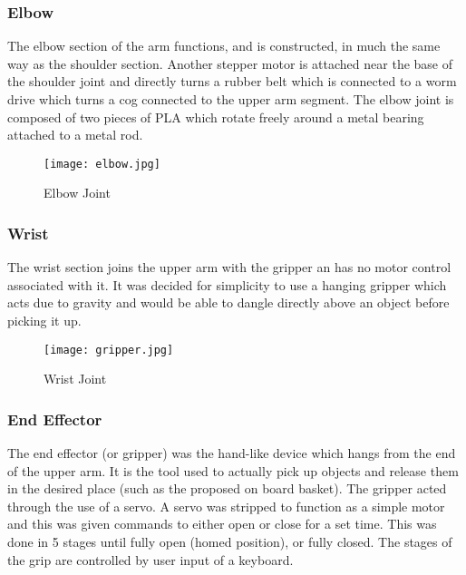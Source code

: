 \subsubsection{Elbow}
The elbow section of the arm functions, and is constructed, in much the same way as the shoulder section.  Another stepper motor is attached near the base of the shoulder joint and directly turns a rubber belt which is connected to a worm drive which turns a cog connected to the upper arm segment.  The elbow joint is composed of two pieces of PLA which rotate freely around a metal bearing attached to a metal rod.

\begin{figure}[!htb]
\begin{center}
\texttt{[image: elbow.jpg]}
\end{center}
\caption{Elbow Joint}
\label{fig:elbow}
\end{figure}

\subsubsection{Wrist}
The wrist section joins the upper arm with the gripper an has no motor control associated with it.  It was decided for simplicity to use a hanging gripper which acts due to gravity and would be able to dangle directly above an object before picking it up. 

\begin{figure}[!htb]
\begin{center}
\texttt{[image: gripper.jpg]}
\end{center}
\caption{Wrist Joint}
\label{fig:wrist}
\end{figure}

\subsubsection{End Effector}
The end effector (or gripper) was the hand-like device which hangs from the end of the upper arm.  It is the tool used to actually pick up objects and release them in the desired place (such as the proposed on board basket).  The gripper acted through the use of a servo.  A servo was stripped to function as a simple motor and this was given commands to either open or close for a set time.  This was done in 5 stages until fully open (homed position), or fully closed.  The stages of the grip are controlled by user input of a keyboard.

%
%


